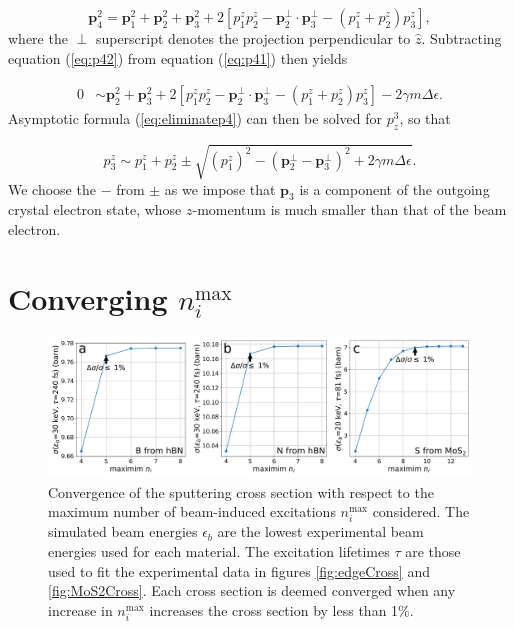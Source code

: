 \documentclass{article}
\begin{document}
\begin{equation}
  \mathbf{p}_4^2
  =
  \mathbf{p}_1^2 + \mathbf{p}_2^2 + \mathbf{p}_3^2
  + 2\left[
  p^z_1p^z_2 - \mathbf{p}^{\perp}_2 \cdot \mathbf{p}^{\perp}_3 
    - (p^z_1 + p^z_2)p^z_3
  \right],
  \label{eq:p42}
\end{equation}
%
where the $\perp$ superscript denotes the projection perpendicular to
$\hat{z}$.
Subtracting equation (\ref{eq:p42}) from equation (\ref{eq:p41}) then yields

\begin{equation}
\label{eq:eliminatep4}
\begin{aligned}
    0
    &\sim
    \mathbf{p}_2^2 + \mathbf{p}_3^2
    +
    2\left[
    p^z_1p^z_2 - \mathbf{p}^{\perp}_2 \cdot \mathbf{p}^{\perp}_3 - (p^z_1 + p^z_2)p^z_3
    \right]
    -
    2\gamma m\Delta\epsilon.
\end{aligned}
\end{equation}
%
Asymptotic formula (\ref{eq:eliminatep4}) can then be solved for $p^3_z$, so that

\begin{equation}
\label{eq:p3z}
    p_3^z
    \sim
    p_1^z + p_2^z
    \pm
    \sqrt{
    \left(p_1^z\right)^2
    -
    \left(\mathbf{p}_2^\perp - \mathbf{p}_3^\perp\right)^2
    +
    2\gamma m\Delta\epsilon
    }.
\end{equation}
%
We choose the $-$ from $\pm$ as we impose that $\mathbf{p}_3$ is a
component of the outgoing crystal electron state, whose $z$-momentum is much
smaller than that of the beam electron.

\pagebreak
\section{Converging $n_i^\text{max}$}
\label{app:nimax}

\begin{figure}[H]
  \centering
  \includegraphics[width=\textwidth]{figS1.pdf}
  \caption{
    Convergence of the sputtering cross section with respect to the maximum
    number of beam-induced excitations $n_i^\text{max}$ considered.
    The simulated beam energies $\epsilon_b$ are the lowest experimental beam
    energies used for each material.
    The excitation lifetimes $\tau$ are those used to fit the experimental data
    in figures \ref{fig:edgeCross} and \ref{fig:MoS2Cross}.
    Each cross section is deemed converged when any increase in $n_i^\text{max}$
    increases the cross section by less than 1\%.
  }
  \label{fig:nimax}
\end{figure}
\end{document}
